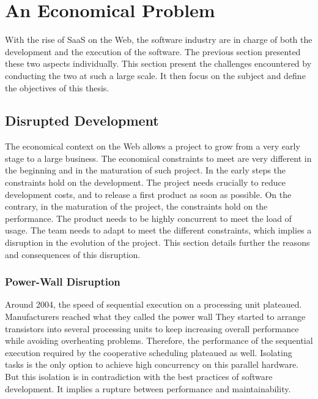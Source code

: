 \section{An Economical Problem} \label{chapter2:problem-statement}

With the rise of SaaS on the Web, the software industry are in charge of both the development and the execution of the software.
The previous section presented these two aspects individually.
This section present the challenges encountered by conducting the two at such a large scale.
It then focus on the subject and define the objectives of this thesis.

\subsection{Disrupted Development}

The economical context on the Web allows a project to grow from a very early stage to a large business.
The economical constraints to meet are very different in the beginning and in the maturation of such project.
In the early steps the constraints hold on the development.
The project needs crucially to reduce development costs, and to release a first product as soon as possible.
On the contrary, in the maturation of the project, the constraints hold on the performance.
The product needs to be highly concurrent to meet the load of usage.
The team needs to adapt to meet the different constraints, which implies a disruption in the evolution of the project.
This section details further the reasons and consequences of this disruption.

\subsubsection{Power-Wall Disruption}


Around 2004, the speed of sequential execution on a processing unit plateaued.
Manufacturers reached what they called the power wall
They started to arrange transistors into several processing units to keep increasing overall performance while avoiding overheating problems.
Therefore, the performance of the sequential execution required by the cooperative scheduling plateaued as well.
Isolating tasks is the only option to achieve high concurrency on this parallel hardware.
But this isolation is in contradiction with the best practices of software development.
It implies a rupture between performance and maintainability.

